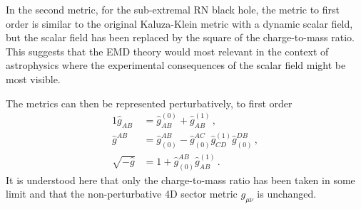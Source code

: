 In the second metric, for the sub-extremal RN black hole, the metric to first order is similar to the original Kaluza-Klein metric with a dynamic scalar field, but the scalar field has been replaced by the square of the charge-to-mass ratio. This suggests that the EMD theory would most relevant in the context of astrophysics where the experimental consequences of the scalar field might be most visible.

The metrics can then be represented perturbatively, to first order
\begin{alignat}{1}
 	\label{eq:ScalePerturbCo}\hat{g}_{AB}&=\hat{g}_{AB}^{(0)}+\hat{g}_{AB}^{(1)}\,,\\
 	\label{eq:ScalePerturbContra}\hat{g}^{AB}&=\hat{g}^{AB}_{(0)}-\hat{g}^{AC}_{(0)}\hat{g}_{CD}^{(1)}\hat{g}^{DB}_{(0)}\,,\\
 	\label{eq:ScalePerturbDet}\sqrt{-\hat{g}}&=1+\hat{g}^{AB}_{(0)}\hat{g}_{AB}^{(1)}\,.
\end{alignat}
It is understood here that only the charge-to-mass ratio has been taken in some limit and that the non-perturbative 4D sector metric $g_{\mu\nu}$ is unchanged.


